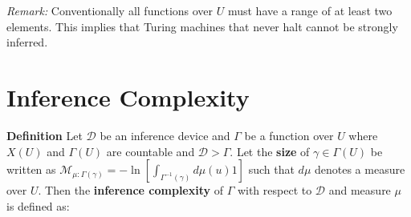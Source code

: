 \documentclass[11pt]{article}
\newcommand{\N}{\mathbb{N}}
\begin{document}
\textit{Remark:} Conventionally all functions over $ U $ must have a range of at least two elements. This implies that Turing machines that never halt cannot be strongly inferred.






%
%       




\newpage
\section{Inference Complexity}

\textbf{Definition} \quad Let $ \mathcal{D} $ be an inference device and $ \Gamma $ be a function over $ U $ where $ X(U) $ and $ \Gamma(U) $ are countable and $ \mathcal{D} > \Gamma $. Let the \textbf{size} of $\gamma \in \Gamma(U) $ be written as $ \mathcal{M}_{\mu:\Gamma(\gamma)} = -\ln[\int_{\Gamma^{-1}(\gamma)} d\mu(u) 1] $ such that $ d\mu $ denotes a measure over $ U $. Then the \textbf{inference complexity} of $ \Gamma $ with respect to $ \mathcal{D} $ and measure $ \mu $ is defined as: 
\end{document}
